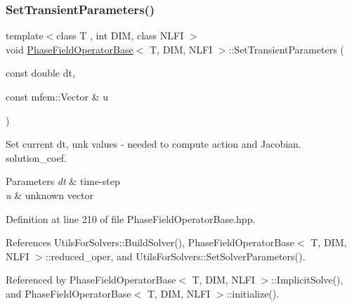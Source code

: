\subsubsection{\texorpdfstring{Set\+Transient\+Parameters()}{SetTransientParameters()}}
{\footnotesize\ttfamily template$<$class T , int D\+IM, class N\+L\+FI $>$ \\
void \hyperlink{classPhaseFieldOperatorBase}{Phase\+Field\+Operator\+Base}$<$ T, D\+IM, N\+L\+FI $>$\+::Set\+Transient\+Parameters (\begin{DoxyParamCaption}\item[{const double}]{dt,  }\item[{const mfem\+::\+Vector \&}]{u }\end{DoxyParamCaption})\hspace{0.3cm}{\ttfamily [inherited]}}



Set current dt, unk values -\/ needed to compute action and Jacobian. solution\+\_\+coef. 


\begin{DoxyParams}{Parameters}
{\em dt} & time-\/step \\
\hline
{\em u} & unknown vector \\
\hline
\end{DoxyParams}


Definition at line 210 of file Phase\+Field\+Operator\+Base.\+hpp.



References Utils\+For\+Solvers\+::\+Build\+Solver(), Phase\+Field\+Operator\+Base$<$ T, D\+I\+M, N\+L\+F\+I $>$\+::reduced\+\_\+oper, and Utils\+For\+Solvers\+::\+Set\+Solver\+Parameters().



Referenced by Phase\+Field\+Operator\+Base$<$ T, D\+I\+M, N\+L\+F\+I $>$\+::\+Implicit\+Solve(), and Phase\+Field\+Operator\+Base$<$ T, D\+I\+M, N\+L\+F\+I $>$\+::initialize().


